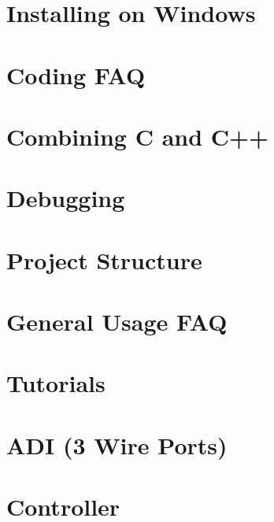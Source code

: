 \let\mypdfximage\pdfximage\def\pdfximage{\immediate\mypdfximage}\documentclass[twoside]{book}
\newcommand{\+}{\discretionary{\mbox{\scriptsize$\hookleftarrow$}}{}{}}
\begin{document}
\chapter{Installing on Windows}
\label{md_docs_getting-started_windows}

\chapter{Coding F\+AQ}
\label{md_docs_tutorials_general_coding-faq}

\chapter{Combining C and C++}
\label{md_docs_tutorials_general_combining-c-cpp}

\chapter{Debugging}
\label{md_docs_tutorials_general_debugging}

\chapter{Project Structure}
\label{md_docs_tutorials_general_project-structure}

\chapter{General Usage F\+AQ}
\label{md_docs_tutorials_general_usage-faq}

\chapter{Tutorials}
\label{md_docs_tutorials_index}

\chapter{A\+DI (3 Wire Ports)}
\label{md_docs_tutorials_topical_adi}

\chapter{Controller}
\label{md_docs_tutorials_topical_controller}

\end{document}
